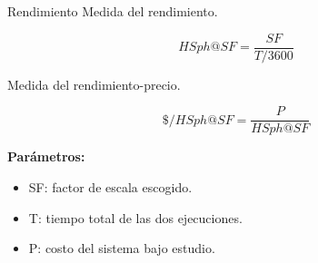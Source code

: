 		\begin{frame}{Rendimiento}		
			{\color{ChetwodeBlue}\large Medida del rendimiento.}
								
					$$ HSph@SF = \frac{SF}{T/3600} $$				
				
			{\color{ChetwodeBlue}\large Medida del rendimiento-precio.}
			
					$$ \$/HSph@SF = \frac{P}{HSph@SF} $$
					
			\begin{tcolorbox}[colback=blue!5,colframe=blue!15]
				\textbf{Parámetros:}
		
				\begin{itemize}
					\fontsize{10}{10}\selectfont
					\item SF: factor de escala escogido.
					\item T: tiempo total de las dos ejecuciones.
					\item P: costo del sistema bajo estudio.
				\end{itemize}
			\end{tcolorbox}
		\end{frame}
				 